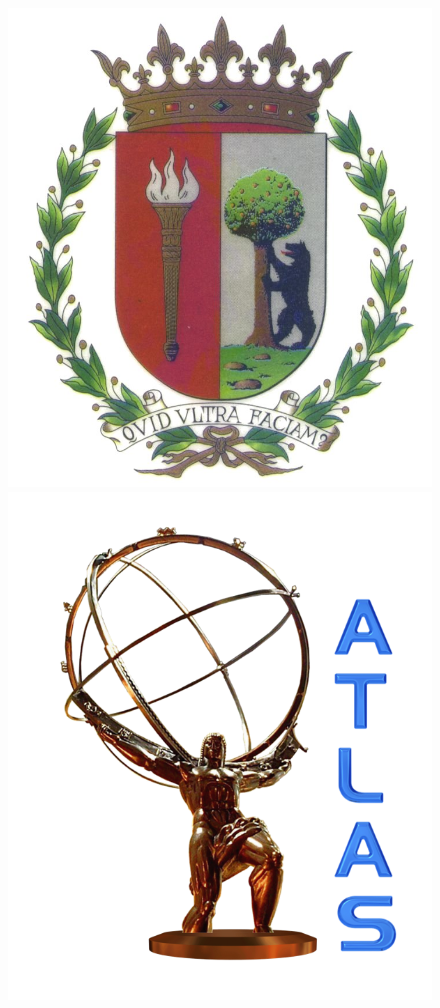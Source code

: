 \documentclass[12pt, twoside]{article}
\numberwithin{equation}{section}
\numberwithin{figure}{section}
\newenvironment{changemargin}[2]{%
\begin{list}{}{%
\setlength{\topsep}{0pt}%
\setlength{\leftmargin}{#1}%
\setlength{\rightmargin}{#2}%
\setlength{\listparindent}{\parindent}%
\setlength{\itemindent}{\parindent}%
\setlength{\parsep}{\parskip}%
}%
\item[]}{\end{list}}
\begin{document}
\begin{changemargin}{-1cm}{0cm}
\begin{figure}[ht]
                \hbox{\includegraphics[height=\ht2]{images/logo_UAM.jpg}}
                \hbox{\includegraphics[height=\ht2]{images/logo_ATLAS.png}}

\end{figure}
\end{changemargin}
\end{document}
